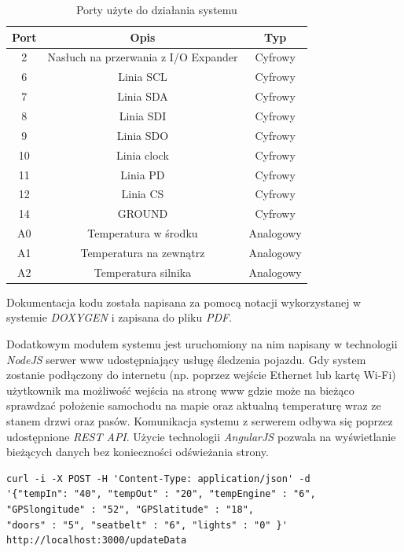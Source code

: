 \documentclass{xmgr}
\begin{document}
\begin{table}[!tbh]
\begin{tabular}{|c|c|c|} \hline
\textbf{Port} & \textbf{Opis} & \textbf{Typ} \\ \hline
	2 & Nasłuch na przerwania z I/O Expander & Cyfrowy \\ \hline
	6 & Linia SCL & Cyfrowy \\ \hline
	7 & Linia SDA & Cyfrowy \\ \hline
	8 & Linia SDI & Cyfrowy \\ \hline
	9 & Linia SDO & Cyfrowy \\ \hline
	10 & Linia clock & Cyfrowy \\ \hline
	11 & Linia PD & Cyfrowy \\ \hline
	12 & Linia CS & Cyfrowy \\ \hline
	14 & GROUND & Cyfrowy \\ \hline
	A0 & Temperatura w środku & Analogowy \\ \hline
	A1 & Temperatura na zewnątrz & Analogowy \\ \hline
	A2 & Temperatura silnika & Analogowy \\ \hline
\end{tabular}
\caption{Porty użyte do działania systemu}
\end{table}

Dokumentacja kodu została napisana za pomocą notacji wykorzystanej w systemie \emph{DOXYGEN} i zapisana do pliku \emph{PDF}.

Dodatkowym modułem systemu jest uruchomiony na nim napisany w technologii \emph{NodeJS} serwer www udostępniający usługę śledzenia pojazdu. Gdy system zostanie podłączony do internetu (np. poprzez wejście Ethernet lub kartę Wi-Fi) użytkownik ma możliwość wejścia na stronę www gdzie może na bieżąco sprawdzać położenie samochodu na mapie oraz aktualną temperaturę wraz ze stanem drzwi oraz pasów. Komunikacja systemu z serwerem odbywa się poprzez udostępnione \emph{REST API}. Użycie technologii \emph{AngularJS} pozwala na wyświetlanie bieżących danych bez konieczności odświeżania strony.

\begin{lstlisting}[label=bot-dirs-alg,caption=Request wysyłany do serwera www]
curl -i -X POST -H 'Content-Type: application/json' -d 
'{"tempIn": "40", "tempOut" : "20", "tempEngine" : "6", 
"GPSlongitude" : "52", "GPSlatitude" : "18", 
"doors" : "5", "seatbelt" : "6", "lights" : "0" }' 
http://localhost:3000/updateData
\end{lstlisting}
\end{document}
